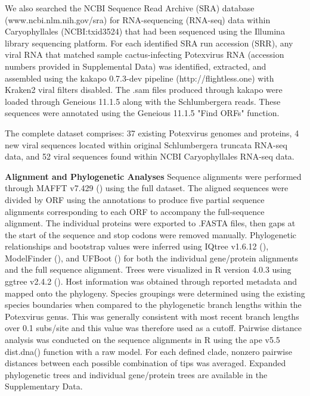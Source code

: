 \documentclass{article}
\begin{document}
We also searched the NCBI Sequence Read Archive (SRA) database (www.ncbi.nlm.nih.gov/sra) for RNA-sequencing (RNA-seq) data within Caryophyllales (NCBI:txid3524) that had been sequenced using the Illumina library sequencing platform. 
For each identified SRA run accession (SRR), any viral RNA that matched sample cactus-infecting Potexvirus RNA (accession numbers provided in Supplemental Data) was identified, extracted, and assembled using the kakapo 0.7.3-dev pipeline (http://flightless.one) with Kraken2 viral filters disabled. 
The .sam files produced through kakapo were loaded through Geneious 11.1.5 along with the Schlumbergera reads.
These sequences were annotated using the Geneious 11.1.5 "Find ORFs" function. 

The complete dataset comprises: 37 existing Potexvirus genomes and proteins, 4 new viral sequences located within original Schlumbergera truncata RNA-seq data, and 52 viral sequences found within NCBI Caryophyllales RNA-seq data.

\textbf{Alignment and Phylogenetic Analyses}
Sequence alignments were performed through MAFFT v7.429 (\cite{katoh_mafft_2002}) using the full dataset.
The aligned sequences were divided by ORF using the annotations to produce five partial sequence alignments corresponding to each ORF to accompany the full-sequence alignment. 
The individual proteins were exported to .FASTA files, then gaps at the start of the sequence and stop codons were removed manually. 
Phylogenetic relationships and bootstrap values were inferred using IQtree v1.6.12 (\cite{nguyen_iq-tree_2015}), ModelFinder (\cite{kalyaanamoorthy_modelfinder_2017}), and UFBoot (\cite{hoang_ufboot2_2018}) for both the individual gene/protein alignments and the full sequence alignment. 
Trees were visualized in R version 4.0.3 using ggtree v2.4.2 (\cite{yu_ggtree_2017}). 
Host information was obtained through reported metadata and mapped onto the phylogeny. 
Species groupings were determined using the existing species boundaries when compared to the phylogenetic branch lengths within the Potexvirus genus. 
This was generally consistent with most recent branch lengths over 0.1 subs/site and this value was therefore used as a cutoff. 
Pairwise distance analysis was conducted on the sequence alignments in R using the ape v5.5  dist.dna() function with a raw model. 
For each defined clade, nonzero pairwise distances between each possible combination of tips was averaged. 
Expanded phylogenetic trees and individual gene/protein trees are available in the Supplementary Data.
\end{document}
